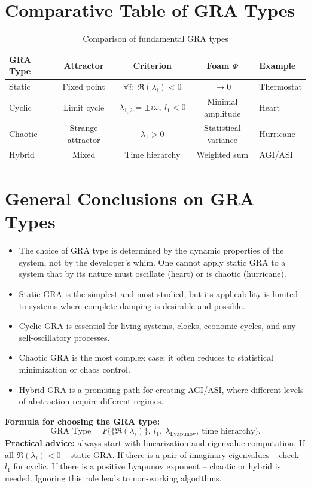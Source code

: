 \documentclass[12pt,a4paper]{article}
\begin{document}
\section{Comparative Table of GRA Types}

\begin{table}[h!]
\centering
\caption{Comparison of fundamental GRA types}
\label{tab:comparison}
\begin{tabular}{@{}lccc>{\raggedright}p{3cm}@{}}
\toprule
GRA Type & Attractor & Criterion & Foam $\Phi$ & Example \\
\midrule
Static & Fixed point & $\forall i:\ \Re(\lambda_i)<0$ & $\to 0$ & Thermostat \\
Cyclic & Limit cycle & $\lambda_{1,2}=\pm i\omega,\ l_1<0$ & Minimal amplitude & Heart \\
Chaotic & Strange attractor & $\lambda_1>0$ & Statistical variance & Hurricane \\
Hybrid & Mixed & Time hierarchy & Weighted sum & AGI/ASI \\
\bottomrule
\end{tabular}
\end{table}

\section{General Conclusions on GRA Types}

\begin{itemize}
    \item The choice of GRA type is determined by the dynamic properties of the system, not by the developer's whim. One cannot apply static GRA to a system that by its nature must oscillate (heart) or is chaotic (hurricane).
    \item Static GRA is the simplest and most studied, but its applicability is limited to systems where complete damping is desirable and possible.
    \item Cyclic GRA is essential for living systems, clocks, economic cycles, and any self-oscillatory processes.
    \item Chaotic GRA is the most complex case; it often reduces to statistical minimization or chaos control.
    \item Hybrid GRA is a promising path for creating AGI/ASI, where different levels of abstraction require different regimes.
\end{itemize}

\textbf{Formula for choosing the GRA type:}
\begin{equation}
    \text{GRA Type} = F\bigl( \{\Re(\lambda_i)\},\ l_1,\ \lambda_{\text{Lyapunov}},\ \text{time hierarchy} \bigr).
\end{equation}
\textbf{Practical advice:} always start with linearization and eigenvalue computation. If all $\Re(\lambda_i)<0$ – static GRA. If there is a pair of imaginary eigenvalues – check $l_1$ for cyclic. If there is a positive Lyapunov exponent – chaotic or hybrid is needed. Ignoring this rule leads to non-working algorithms.
\end{document}
